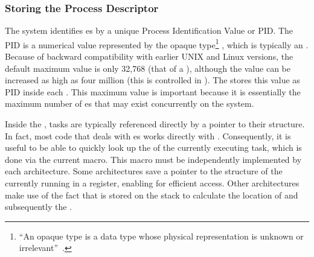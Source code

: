 \subsubsection{Storing the Process Descriptor}\label{subsubsec:Storing_Process_Descriptor}
The system identifies es by a unique Process Identification Value or PID.\@
The PID is a numerical value represented by the opaque type\footnote{``An opaque type is a data type whose physical representation is unknown or irrelevant''~\cite[pg.~26]{LKD3}.} , which is typically an .
Because of backward compatibility with earlier UNIX and Linux versions, the default maximum value is only 32,768 (that of a ), although the value can be increased as high as four million (this is controlled in ).
The  stores this value as PID inside each .
This maximum value is important because it is essentially the maximum number of es that may exist concurrently on the system.

Inside the , tasks are typically referenced directly by a pointer to their  structure.
In fact, most  code that deals with es works directly with .
Consequently, it is useful to be able to quickly look up the  of the currently executing task, which is done via the current macro.
This macro must be independently implemented by each architecture.
Some architectures save a pointer to the  structure of the currently running  in a register, enabling for efficient access.
Other architectures make use of the fact that  is stored on the  stack to calculate the location of  and subsequently the .

